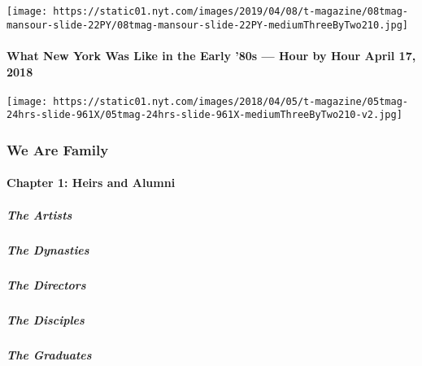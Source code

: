 \texttt{[image: https://static01.nyt.com/images/2019/04/08/t-magazine/08tmag-mansour-slide-22PY/08tmag-mansour-slide-22PY-mediumThreeByTwo210.jpg]}
\href{https://www.nytimes.com/2018/04/17/t-magazine/24-hours-new-york-city-1980s-life.html}{}

\hypertarget{what-new-york-was-like-in-the-early-80s--hour-by-hour-april-17-2018}{%
\paragraph{What New York Was Like in the Early '80s --- Hour by Hour
April 17,
2018}\label{what-new-york-was-like-in-the-early-80s--hour-by-hour-april-17-2018}}

\texttt{[image: https://static01.nyt.com/images/2018/04/05/t-magazine/05tmag-24hrs-slide-961X/05tmag-24hrs-slide-961X-mediumThreeByTwo210-v2.jpg]}

\hypertarget{we-are-family-1}{%
\subsubsection{We Are Family}\label{we-are-family-1}}

\hypertarget{chapter-1-heirs-and-alumni}{%
\paragraph{Chapter 1: Heirs and
Alumni}\label{chapter-1-heirs-and-alumni}}

\href{/interactive/2020/04/13/t-magazine/black-art-galleries.html}{}

\hypertarget{the-artists}{%
\subparagraph{The Artists}\label{the-artists}}

\href{/interactive/2020/04/13/t-magazine/italian-fashion-design-houses.html}{}

\hypertarget{the-dynasties}{%
\subparagraph{The Dynasties}\label{the-dynasties}}

\href{/interactive/2020/04/13/t-magazine/gordon-parks.html}{}

\hypertarget{the-directors}{%
\subparagraph{The Directors}\label{the-directors}}

\href{/interactive/2020/04/13/t-magazine/enrique-olvera-chef.html}{}

\hypertarget{the-disciples}{%
\subparagraph{The Disciples}\label{the-disciples}}

\href{/interactive/2020/04/13/t-magazine/royal-academy-antwerp.html}{}

\hypertarget{the-graduates}{%
\subparagraph{The Graduates}\label{the-graduates}}

